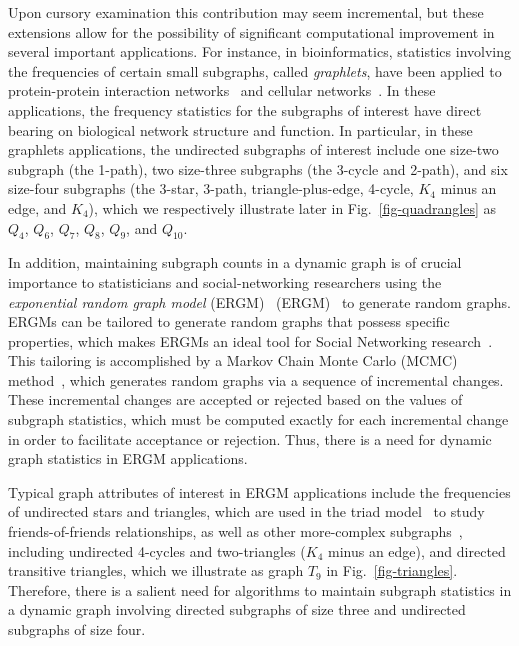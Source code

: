 \documentclass[11pt]{article}
\begin{document}
Upon cursory examination this contribution may seem incremental, but these 
extensions allow for the possibility of significant computational improvement in several important applications.
For instance, in bioinformatics, statistics involving the frequencies of 
certain small subgraphs, called \emph{graphlets}, have been applied
to protein-protein interaction networks~\cite{tp-ubnfv-08,pcj-eegfd-06} 
and cellular networks~\cite{p-bncug-07}.
In these applications, the frequency statistics for the
subgraphs of interest
have direct bearing on biological network structure and function.
In particular, in these graphlets applications,
the undirected subgraphs of interest include 
one size-two subgraph (the 1-path), two size-three subgraphs
(the 3-cycle and 2-path), and six size-four subgraphs
(the 3-star, 3-path, triangle-plus-edge, 4-cycle, $K_4$ minus an
edge, and $K_4$), which we respectively illustrate later in 
Fig.~\ref{fig-quadrangles}
as 
$Q_4$, 
$Q_6$, 
$Q_7$, 
$Q_8$, 
$Q_9$, 
and $Q_{10}$.

In addition,
maintaining subgraph counts in a dynamic graph is of crucial
importance to statisticians and social-networking researchers using the 
\emph{exponential random graph model} 
\ifFull
(ERGM)~\cite{Fra-SN-91,RobMor-SN-07,Sni-JoSS-02,WasPat-Psy-96}
\else
(ERGM)~\cite{Fra-SN-91,Sni-JoSS-02,WasPat-Psy-96}
\fi
to generate random graphs.
ERGMs can be tailored to
generate random graphs that possess
specific properties, which makes ERGMs an ideal tool for Social
Networking research~\cite{WasPat-Psy-96,Sni-JoSS-02}.
This tailoring is accomplished by
a Markov Chain Monte Carlo (MCMC) method~\cite{Sni-JoSS-02},
which generates random 
graphs via a sequence of incremental changes.
These incremental changes are accepted or rejected based on
the values of subgraph statistics, which must
be computed exactly for each incremental change in order to
facilitate acceptance or rejection.
Thus, there is a need for dynamic graph statistics in ERGM
applications.

Typical graph attributes of interest in ERGM applications include
the frequencies of undirected stars and triangles, 
which are used in the triad model~\cite{FraStr-JASA-86}
to study friends-of-friends relationships, as well as
other more-complex subgraphs~\cite{SniPatRob-SM-06},
including undirected 4-cycles and two-triangles ($K_4$ minus an edge), 
and directed transitive triangles, which we illustrate as graph $T_9$
in Fig.~\ref{fig-triangles}.
Therefore, there is
a salient need for algorithms to maintain subgraph statistics
in a dynamic graph involving directed subgraphs of size three and
undirected subgraphs of size four.
\end{document}
